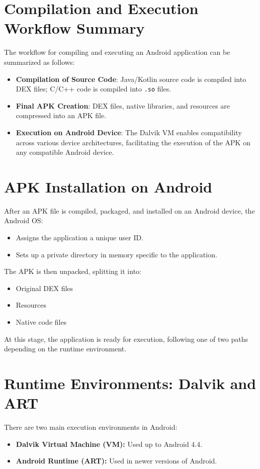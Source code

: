 \documentclass{article}
\begin{document}
\section{Compilation and Execution Workflow Summary}
The workflow for compiling and executing an Android application can be summarized as follows:
\begin{itemize}
    \item \textbf{Compilation of Source Code}: Java/Kotlin source code is compiled into DEX files; C/C++ code is compiled into \texttt{.so} files.
    \item \textbf{Final APK Creation}: DEX files, native libraries, and resources are compressed into an APK file.
    \item \textbf{Execution on Android Device}: The Dalvik VM enables compatibility across various device architectures, facilitating the execution of the APK on any compatible Android device.
\end{itemize}

\section{APK Installation on Android}
After an APK file is compiled, packaged, and installed on an Android device, the Android OS:
\begin{itemize}
    \item Assigns the application a unique user ID.
    \item Sets up a private directory in memory specific to the application.
\end{itemize}

The APK is then unpacked, splitting it into:
\begin{itemize}
    \item Original DEX files
    \item Resources
    \item Native code files
\end{itemize}

At this stage, the application is ready for execution, following one of two paths depending on the runtime environment.

\section{Runtime Environments: Dalvik and ART}
There are two main execution environments in Android:
\begin{itemize}
    \item \textbf{Dalvik Virtual Machine (VM):} Used up to Android 4.4.
    \item \textbf{Android Runtime (ART):} Used in newer versions of Android.
\end{itemize}
\end{document}
